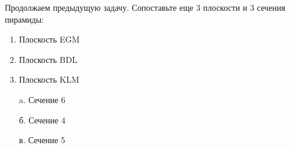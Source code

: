 
Продолжаем предыдущую задачу.  Сопоставьте еще 3 плоскости и 3 сечения пирамиды:


\begin{multicols}{2}
    {
        \begin{enumerate}
            \item Плоскость EGM
            \item Плоскость BDL
            \item Плоскость KLM
        \end{enumerate}
    }
    {
        \begin{enumerate}
            \item[a.] Сечение 6
            \item[б.] Сечение 4
            \item[в.] Сечение 5  
        \end{enumerate}
    }
    
\end{multicols}